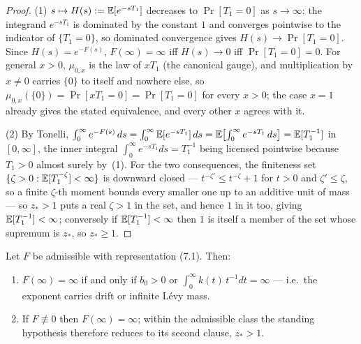 \begin{proof}
(1) $s \mapsto H(s) := \mathbb{E}[e^{-sT_1}]$ decreases to $\Pr[T_1 = 0]$ as $s \to \infty$: the
integrand $e^{-sT_1}$ is dominated by the constant $1$ and converges pointwise to the indicator
of $\{T_1 = 0\}$, so dominated convergence gives $H(s) \to \Pr[T_1=0]$. Since $H(s) = e^{-F(s)}$,
$F(\infty) = \infty$ iff $H(s) \to 0$ iff $\Pr[T_1 = 0] = 0$. For general $x > 0$, $\mu_{0,x}$ is
the law of $xT_1$ (the canonical gauge), and multiplication by $x \ne 0$ carries $\{0\}$ to
itself and nowhere else, so $\mu_{0,x}(\{0\}) = \Pr[xT_1 = 0] = \Pr[T_1 = 0]$ for every $x > 0$;
the case $x=1$ already gives the stated equivalence, and every other $x$ agrees with it.

(2) By Tonelli, $\int_0^\infty e^{-F(s)}\,ds = \int_0^\infty \mathbb{E}[e^{-sT_1}]\,ds =
\mathbb{E}\bigl[\int_0^\infty e^{-sT_1}\,ds\bigr] = \mathbb{E}[T_1^{-1}]$ in $[0,\infty]$, the inner integral
$\int_0^\infty e^{-sT_1}ds = T_1^{-1}$ being licensed pointwise because $T_1 > 0$ almost surely
by~(1). For the two consequences, the finiteness set
$\{\zeta > 0 : \mathbb{E}[T_1^{-\zeta}] < \infty\}$ is downward closed --- $t^{-\zeta'} \le
t^{-\zeta} + 1$ for $t > 0$ and $\zeta' \le \zeta$, so a finite $\zeta$-th moment bounds every
smaller one up to an additive unit of mass --- so $z_* > 1$ puts a real $\zeta > 1$ in the set,
and hence $1$ in it too, giving $\mathbb{E}[T_1^{-1}] < \infty$; conversely if $\mathbb{E}[T_1^{-1}] < \infty$
then $1$ is itself a member of the set whose supremum is $z_*$, so $z_* \ge 1$.
\end{proof}

\begin{lemma}\label{lem:standing-levy-reading}
Let $F$ be admissible with representation (7.1). Then:
\begin{enumerate}
\item $F(\infty) = \infty$ if and only if $b_0 > 0$ or $\int_0^\infty k(t)\,t^{-1}dt = \infty$
--- i.e.\ the exponent carries drift or infinite Lévy mass.
\item If $F \not\equiv 0$ then $F(\infty) = \infty$; within the admissible class the standing
hypothesis therefore reduces to its second clause, $z_* > 1$.
\end{enumerate}
\end{lemma}

